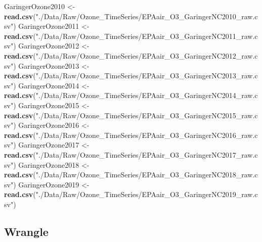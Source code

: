 \documentclass[
]{article}
\newenvironment{Shaded}{\begin{snugshade}}{\end{snugshade}}
\newcommand{\KeywordTok}[1]{\textcolor[rgb]{0.13,0.29,0.53}{\textbf{#1}}}
\newcommand{\NormalTok}[1]{#1}
\newcommand{\StringTok}[1]{\textcolor[rgb]{0.31,0.60,0.02}{#1}}
\begin{document}
\begin{Shaded}
\begin{Highlighting}[]
\NormalTok{GaringerOzone2010 <-}\StringTok{ }\KeywordTok{read.csv}\NormalTok{(}\StringTok{"./Data/Raw/Ozone_TimeSeries/EPAair_O3_GaringerNC2010_raw.csv"}\NormalTok{)}
\NormalTok{GaringerOzone2011 <-}\StringTok{ }\KeywordTok{read.csv}\NormalTok{(}\StringTok{"./Data/Raw/Ozone_TimeSeries/EPAair_O3_GaringerNC2011_raw.csv"}\NormalTok{)}
\NormalTok{GaringerOzone2012 <-}\StringTok{ }\KeywordTok{read.csv}\NormalTok{(}\StringTok{"./Data/Raw/Ozone_TimeSeries/EPAair_O3_GaringerNC2012_raw.csv"}\NormalTok{)}
\NormalTok{GaringerOzone2013 <-}\StringTok{ }\KeywordTok{read.csv}\NormalTok{(}\StringTok{"./Data/Raw/Ozone_TimeSeries/EPAair_O3_GaringerNC2013_raw.csv"}\NormalTok{)}
\NormalTok{GaringerOzone2014 <-}\StringTok{ }\KeywordTok{read.csv}\NormalTok{(}\StringTok{"./Data/Raw/Ozone_TimeSeries/EPAair_O3_GaringerNC2014_raw.csv"}\NormalTok{)}
\NormalTok{GaringerOzone2015 <-}\StringTok{ }\KeywordTok{read.csv}\NormalTok{(}\StringTok{"./Data/Raw/Ozone_TimeSeries/EPAair_O3_GaringerNC2015_raw.csv"}\NormalTok{)}
\NormalTok{GaringerOzone2016 <-}\StringTok{ }\KeywordTok{read.csv}\NormalTok{(}\StringTok{"./Data/Raw/Ozone_TimeSeries/EPAair_O3_GaringerNC2016_raw.csv"}\NormalTok{)}
\NormalTok{GaringerOzone2017 <-}\StringTok{ }\KeywordTok{read.csv}\NormalTok{(}\StringTok{"./Data/Raw/Ozone_TimeSeries/EPAair_O3_GaringerNC2017_raw.csv"}\NormalTok{)}
\NormalTok{GaringerOzone2018 <-}\StringTok{ }\KeywordTok{read.csv}\NormalTok{(}\StringTok{"./Data/Raw/Ozone_TimeSeries/EPAair_O3_GaringerNC2018_raw.csv"}\NormalTok{)}
\NormalTok{GaringerOzone2019 <-}\StringTok{ }\KeywordTok{read.csv}\NormalTok{(}\StringTok{"./Data/Raw/Ozone_TimeSeries/EPAair_O3_GaringerNC2019_raw.csv"}\NormalTok{)}
\end{Highlighting}
\end{Shaded}

\hypertarget{wrangle}{%
\subsection{Wrangle}\label{wrangle}}
\end{document}
